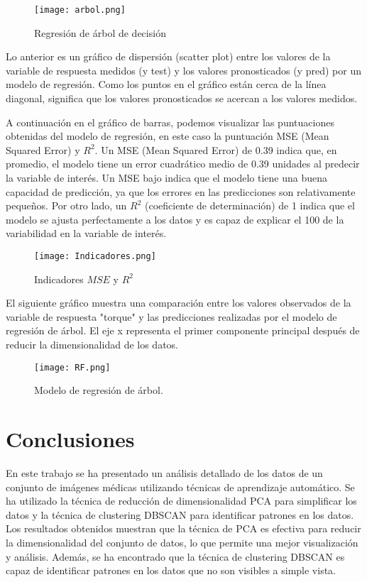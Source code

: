 \documentclass{article}
\begin{document}
\begin{figure}[h]
\centering
\texttt{[image: arbol.png]}
\caption{Regresión de árbol de decisión}
\label{fig:fig3}
\end{figure}

Lo anterior es un gráfico de dispersión (scatter plot) entre los valores de la variable de respuesta medidos (y test) y los valores pronosticados (y pred) por un modelo de regresión. Como los puntos en el gráfico están cerca de la línea diagonal, significa que los valores pronosticados se acercan a los valores medidos.




A continuación en el gráfico de barras, podemos visualizar las puntuaciones obtenidas del modelo de regresión, en este caso la puntuación MSE (Mean Squared Error) y $R^2$. Un MSE (Mean Squared Error) de 0.39 indica que, en promedio, el modelo tiene un error cuadrático medio de 0.39 unidades al predecir la variable de interés. Un MSE bajo indica que el modelo tiene una buena capacidad de predicción, ya que los errores en las predicciones son relativamente pequeños.
Por otro lado, un  $R^2$  (coeficiente de determinación) de 1 indica que el modelo se ajusta perfectamente a los datos y es capaz de explicar el 100 de la variabilidad en la variable de interés.

\begin{figure}[h]
  \centering
  \texttt{[image: Indicadores.png]}
  \caption{Indicadores $MSE$ y $R^2$}
  \label{fig:fig4}
\end{figure}

El siguiente gráfico muestra una comparación entre los valores observados de la variable de respuesta "torque" y las predicciones realizadas por el modelo de regresión de árbol. El eje x representa el primer componente principal después de reducir la dimensionalidad de los datos. 

\begin{figure}[h]
  \centering
  \texttt{[image: RF.png]}
  \caption{Modelo de regresión de árbol.}
  \label{fig:fig5}
\end{figure}

\section{Conclusiones}

En este trabajo se ha presentado un análisis detallado de los datos de un conjunto de imágenes médicas utilizando técnicas de aprendizaje automático. Se ha utilizado la técnica de reducción de dimensionalidad PCA para simplificar los datos y la técnica de clustering DBSCAN para identificar patrones en los datos.
Los resultados obtenidos muestran que la técnica de PCA es efectiva para reducir la dimensionalidad del conjunto de datos, lo que permite una mejor visualización y análisis. Además, se ha encontrado que la técnica de clustering DBSCAN es capaz de identificar patrones en los datos que no son visibles a simple vista.
\end{document}
